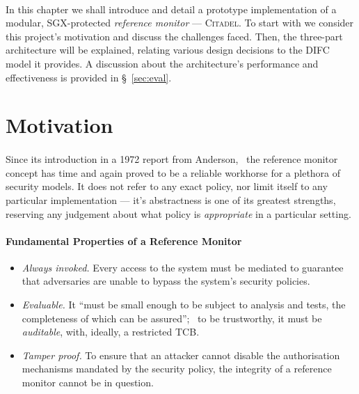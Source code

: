 

\paragraph{} In this chapter we shall introduce and detail a prototype implementation of a modular, SGX-protected \textit{reference monitor} --- \textsc{Citadel}. To start with we consider this project's motivation and discuss the challenges faced. Then, the three-part architecture will be explained, relating various design decisions to the DIFC model it provides. A discussion about the architecture's performance and effectiveness is provided in §~\ref{sec:eval}.

\section{Motivation}
\paragraph{} Since its introduction in a 1972 report from Anderson,~\cite{reference-monitor} the reference monitor concept has time and again proved to be a reliable workhorse for a plethora of security models. It does not refer to any exact policy, nor limit itself to any particular implementation --- it's abstractness is one of its greatest strengths, reserving any judgement about what policy is \textit{appropriate} in a particular setting.~\cite{irvine-rm}

\paragraph{Fundamental Properties of a Reference Monitor}

\begin{itemize}
    \item \textit{Always invoked.} Every access to the system must be mediated to guarantee that adversaries are unable to bypass the system's security policies.
    \item \textit{Evaluable.} It ``must be small enough to be subject to analysis and tests, the completeness of which can be assured'';~\cite{reference-monitor} to be trustworthy, it must be \textit{auditable}, with, ideally, a restricted TCB.
    \item \textit{Tamper proof.} To ensure that an attacker cannot disable the authorisation mechanisms mandated by the security policy, the integrity of a reference monitor cannot be in question.
\end{itemize}

